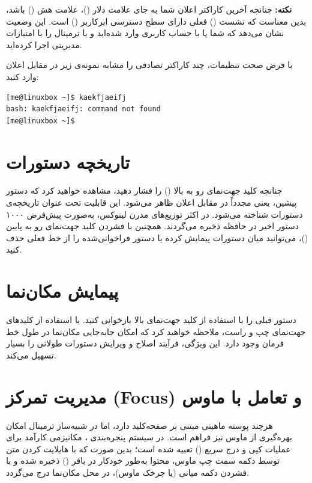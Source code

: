 \begin{note}
\textbf{نکته:} چنانچه آخرین کاراکتر اعلان شما به جای علامت دلار (\cmd{\$})، علامت هش (\cmd{\#}) باشد، بدین معناست که نشست () فعلی دارای سطح دسترسی ابرکاربر () است. این وضعیت نشان می‌دهد که شما یا با حساب کاربری  وارد شده‌اید و یا ترمینال را با امتیازات مدیریتی اجرا کرده‌اید.
\end{note}

با فرض صحت تنظیمات، چند کاراکتر تصادفی را مشابه نمونه‌ی زیر در مقابل اعلان وارد کنید:

\begin{latin}
\begin{lstlisting}
[me@linuxbox ~]$ kaekfjaeifj
bash: kaekfjaeifj: command not found
[me@linuxbox ~]$
\end{lstlisting}
\end{latin}

\section{تاریخچه دستورات}

چنانچه کلید جهت‌نمای رو به بالا () را فشار دهید، مشاهده خواهید کرد که دستور پیشین، یعنی  مجدداً در مقابل اعلان ظاهر می‌شود. این قابلیت تحت عنوان تاریخچه‌ی دستورات شناخته می‌شود. در اکثر توزیع‌های مدرن لینوکس، به‌صورت پیش‌فرض ۱۰۰۰ دستور اخیر در حافظه ذخیره می‌گردند. همچنین با فشردن کلید جهت‌نمای رو به پایین ()، می‌توانید میان دستورات پیمایش کرده یا دستور فراخوانی‌شده را از خط فعلی حذف کنید.

\section{پیمایش مکان‌نما}

دستور قبلی را با استفاده از کلید جهت‌نمای بالا بازخوانی کنید. با استفاده از کلیدهای جهت‌نمای چپ و راست، ملاحظه خواهید کرد که امکان جابه‌جایی مکان‌نما در طول خط فرمان وجود دارد. این ویژگی، فرآیند اصلاح و ویرایش دستورات طولانی را بسیار تسهیل می‌کند.

\section{مدیریت تمرکز (Focus) و تعامل با ماوس}

هرچند پوسته ماهیتی مبتنی بر صفحه‌کلید دارد، اما در شبیه‌ساز ترمینال امکان بهره‌گیری از ماوس نیز فراهم است. در سیستم پنجره‌بندی ، مکانیزمی کارآمد برای عملیات کپی و درج سریع () تعبیه شده است؛ بدین صورت که با هایلایت کردن متن توسط دکمه سمت چپ ماوس، محتوا به‌طور خودکار در بافر () ذخیره شده و با فشردن دکمه میانی (یا چرخک ماوس)، در محل مکان‌نما درج می‌گردد.

